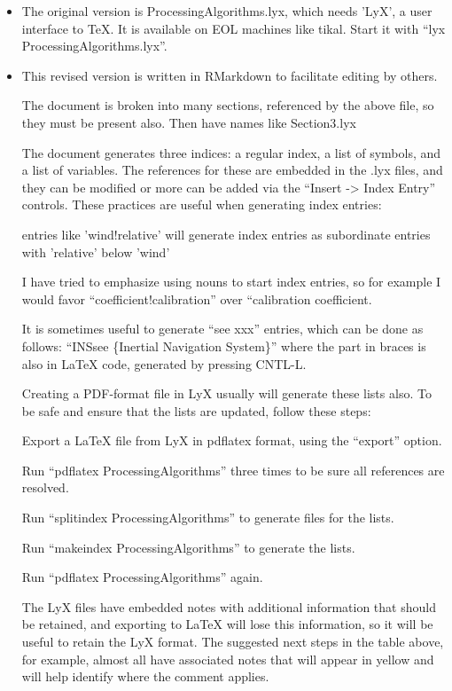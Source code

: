 \documentclass[
  english,
]{book}
\providecommand{\tightlist}{%
  \setlength{\itemsep}{0pt}\setlength{\parskip}{0pt}}
\begin{document}
\begin{itemize}
\tightlist
\item
  The original version is ProcessingAlgorithms.lyx, which needs 'LyX', a user interface to TeX. It is available on EOL machines like tikal. Start it with ``lyx ProcessingAlgorithms.lyx''.
\item
  This revised version is written in RMarkdown to facilitate editing by others.

  The document is broken into many sections, referenced by the above file, so they must be present also. Then have names like Section3.lyx

  The document generates three indices: a regular index, a list of symbols, and a list of variables. The references for these are embedded in the .lyx files, and they can be modified or more can be added via the ``Insert -\textgreater{} Index Entry'' controls. These practices are useful when generating index entries:

  entries like 'wind!relative' will generate index entries as subordinate entries with 'relative' below 'wind'

  I have tried to emphasize using nouns to start index entries, so for example I would favor ``coefficient!calibration'' over ``calibration coefficient.

  It is sometimes useful to generate ``see xxx'' entries, which can be done as follows: ``INS\textbar see \{Inertial Navigation System\}'' where the part in braces is also in LaTeX code, generated by pressing CNTL-L.

  Creating a PDF-format file in LyX usually will generate these lists also. To be safe and ensure that the lists are updated, follow these steps:

  Export a LaTeX file from LyX in pdflatex format, using the ``export'' option.

  Run ``pdflatex ProcessingAlgorithms'' three times to be sure all references are resolved.

  Run ``splitindex ProcessingAlgorithms'' to generate files for the lists.

  Run ``makeindex ProcessingAlgorithms'' to generate the lists.

  Run ``pdflatex ProcessingAlgorithms'' again.

  The LyX files have embedded notes with additional information that should be retained, and exporting to LaTeX will lose this information, so it will be useful to retain the LyX format. The suggested next steps in the table above, for example, almost all have associated notes that will appear in yellow and will help identify where the comment applies.


\end{itemize}
\end{document}
